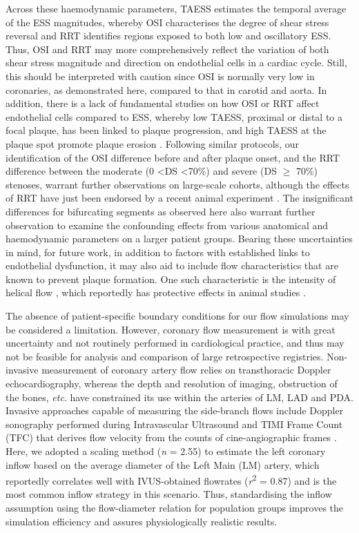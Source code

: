 \documentclass[preprint,11pt,review]{elsarticle}
\begin{document}
Across these haemodynamic parameters, TAESS estimates the temporal average of the ESS magnitudes, whereby OSI characterises the degree of shear stress reversal and RRT identifies regions exposed to both low and oscillatory ESS. Thus, OSI and RRT may more comprehensively reflect the variation of both shear stress magnitude and direction on endothelial cells in a cardiac cycle. Still, this should be interpreted with caution since OSI is normally very low in coronaries, as demonstrated here, compared to that in carotid and aorta. In addition, there is a lack of fundamental studies on how OSI or RRT affect endothelial cells compared to ESS, whereby low TAESS, proximal or distal to a focal plaque, has been linked to plaque progression, and high TAESS at the plaque spot promote plaque erosion \cite{stone_prediction_2012}. Following similar protocols, our identification of the OSI difference before and after plaque onset, and the RRT difference between the moderate (0 \textless DS \textless 70\%) and severe (DS $\geq$ 70\%) stenoses, warrant further observations on large-scale cohorts, although the effects of RRT have just been endorsed by a recent animal experiment \cite{hoogendoorn_multidirectional_2020}. The insignificant differences for bifurcating segments as observed here also warrant further observation to examine the confounding effects from various anatomical and haemodynamic parameters on a larger patient groups. Bearing these uncertainties in mind, for future work, in addition to factors with established links to endothelial dysfunction, it may also aid to include flow characteristics that are known to prevent plaque formation. One such characteristic is the intensity of helical flow \cite{Morbiducci2015rational,Shen2021Secondary}, which reportedly has protective effects in animal studies \cite{de_nisco_impact_2020}. 

The absence of patient-specific boundary conditions for our flow simulations may be considered a limitation. However, coronary flow measurement is with great uncertainty and not routinely performed in cardiological practice, and thus may not be feasible for analysis and comparison of large retrospective registries. Non-invasive measurement of coronary artery flow relies on transthoracic Doppler echocardiography, whereas the depth and resolution of imaging, obstruction of the bones, \textit{etc}. have constrained its use within the arteries of LM, LAD and PDA. Invasive approaches capable of measuring the side-branch flows include Doppler sonography performed during Intravascular Ultrasound and TIMI Frame Count (TFC) that derives flow velocity from the counts of cine-angiographic frames \cite{Kunadian2009Use}. Here, we adopted a scaling method (\textit{n} = 2.55) to estimate the left coronary inflow based on the average diameter of the Left Main (LM) artery, which reportedly correlates well with IVUS-obtained flowrates (\textit{r}\textsuperscript{2} = 0.87) \cite{Giessen2011influence} and is the most common inflow strategy in this scenario. Thus, standardising the inflow assumption using the flow-diameter relation for population groups improves the simulation efficiency and assures physiologically realistic results.  
\end{document}
